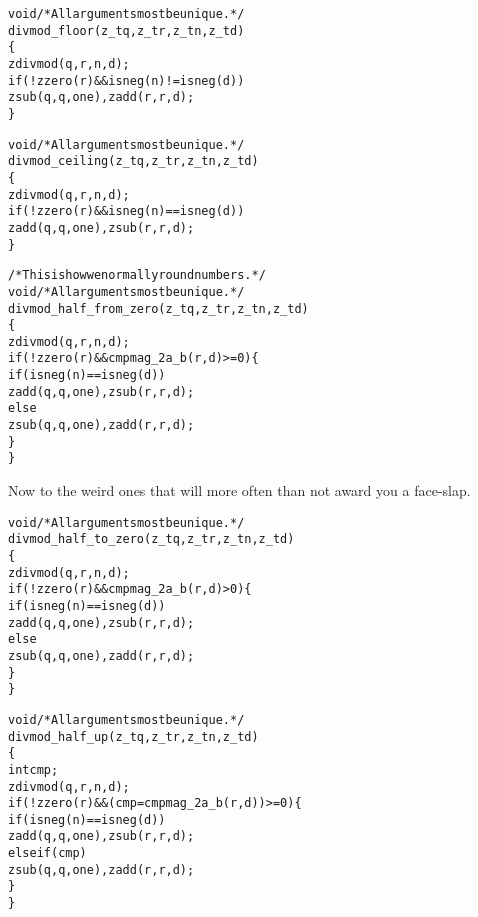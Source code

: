 \begin{alltt}
   void \textcolor{c}{/* \textrm{All arguments most be unique.} */}
   divmod_floor(z_t q, z_t r, z_t n, z_t d)
   \{
       zdivmod(q, r, n, d);
       if (!zzero(r) && isneg(n) != isneg(d))
           zsub(q, q, one), zadd(r, r, d);
   \}
\end{alltt}

\begin{alltt}
   void \textcolor{c}{/* \textrm{All arguments most be unique.} */}
   divmod_ceiling(z_t q, z_t r, z_t n, z_t d)
   \{
       zdivmod(q, r, n, d);
       if (!zzero(r) && isneg(n) == isneg(d))
           zadd(q, q, one), zsub(r, r, d);
   \}
\end{alltt}

\begin{alltt}
   /* \textrm{This is how we normally round numbers.} */
   void \textcolor{c}{/* \textrm{All arguments most be unique.} */}
   divmod_half_from_zero(z_t q, z_t r, z_t n, z_t d)
   \{
       zdivmod(q, r, n, d);
       if (!zzero(r) && cmpmag_2a_b(r, d) >= 0) \{
           if (isneg(n) == isneg(d))
               zadd(q, q, one), zsub(r, r, d);
           else
               zsub(q, q, one), zadd(r, r, d);
       \}
   \}
\end{alltt}

\noindent
Now to the weird ones that will more often than
not award you a face-slap. %

\begin{alltt}
   void \textcolor{c}{/* \textrm{All arguments most be unique.} */}
   divmod_half_to_zero(z_t q, z_t r, z_t n, z_t d)
   \{
       zdivmod(q, r, n, d);
       if (!zzero(r) && cmpmag_2a_b(r, d) > 0) \{
           if (isneg(n) == isneg(d))
               zadd(q, q, one), zsub(r, r, d);
           else
               zsub(q, q, one), zadd(r, r, d);
       \}
   \}
\end{alltt}

\begin{alltt}
   void \textcolor{c}{/* \textrm{All arguments most be unique.} */}
   divmod_half_up(z_t q, z_t r, z_t n, z_t d)
   \{
       int cmp;
       zdivmod(q, r, n, d);
       if (!zzero(r) && (cmp = cmpmag_2a_b(r, d)) >= 0) \{
           if (isneg(n) == isneg(d))
               zadd(q, q, one), zsub(r, r, d);
           else if (cmp)
               zsub(q, q, one), zadd(r, r, d);
       \}
   \}
\end{alltt}

